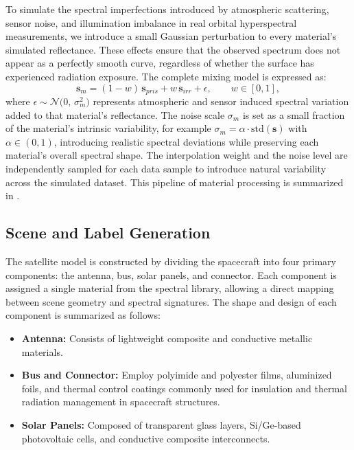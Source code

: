 \documentclass[12pt]{elsarticle}
\begin{document}
To simulate the spectral imperfections introduced by atmospheric scattering, sensor noise, and illumination imbalance in real orbital hyperspectral measurements, we introduce a small Gaussian perturbation to every material’s simulated reflectance. These effects ensure that the observed spectrum does not appear as a perfectly smooth curve, regardless of whether the surface has experienced radiation exposure.
The complete mixing model is expressed as:
\begin{equation}
\mathbf{s}_m 
= (1-w)\,\mathbf{s}_{pris}
+ w\,\mathbf{s}_{irr}
+ \epsilon,
\qquad w \in [0,1],
\end{equation}
where \(\epsilon \sim \mathcal{N}\!\bigl(0,\,\sigma_m^2\bigr)\) 
represents atmospheric and sensor induced spectral variation added to that material’s reflectance. The noise scale \(\sigma_m\) is set as a small fraction of the material’s intrinsic variability, for example 
\(\sigma_m = \alpha\cdot\mathrm{std}(\mathbf{s})\) with 
\(\alpha \in (0,1)\), introducing realistic spectral deviations while preserving each material’s overall spectral shape.
The interpolation weight and the noise level are independently sampled for each data sample to introduce natural variability across the simulated dataset. 
This pipeline of material processing is summarized in .


\subsection{Scene and Label Generation}

The satellite model is constructed by dividing the spacecraft into four primary components: the antenna, bus, solar panels, and connector. Each component is assigned a single material from the spectral library, allowing a direct mapping between scene geometry and spectral signatures. The shape and design of each component is summarized as follows:

\begin{itemize}
    \item \textbf{Antenna:} Consists of lightweight composite and conductive metallic materials. 
    \item \textbf{Bus and Connector:} Employ polyimide and polyester films, aluminized foils, and thermal control coatings commonly used for insulation and thermal radiation management in spacecraft structures.
    \item \textbf{Solar Panels:} Composed of transparent glass layers, Si/Ge-based photovoltaic cells, and conductive composite interconnects.
\end{itemize}
\end{document}
